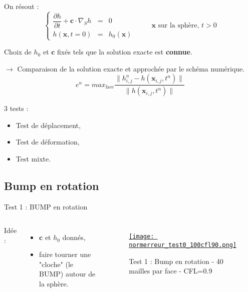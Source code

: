 \documentclass[11pt]{beamer}
\begin{document}
\begin{frame}
On résout :
$$\left\{
\begin{array}{rcl}
\dfrac{\partial h}{\partial t} + \mathbf{c} \cdot \nabla_S h & = & 0 \\
h(\mathbf{x},t=0) & = & h_0 ( \mathbf{x} )
\end{array}
\right. \hspace{1cm} \mathbf{x} \text{ sur la sphère, } t>0$$

Choix de $h_0$ et $\mathbf{c}$ fixés tels que la solution exacte est \textbf{connue}.

$\rightarrow$ Comparaison de la solution exacte et approchée par le schéma numérique.
$$e^n = max_{\text{face}} \dfrac{ \| h^n_{i,j} - h(\mathbf{x}_{i,j}, t^n ) \| }{\| h(\mathbf{x}_{i,j}, t^n ) \|}$$

3 tests : 
\begin{itemize}
\item Test de déplacement,\\
\item Test de déformation,\\
\item Test mixte.
\end{itemize}

\end{frame}



\subsection{Bump en rotation}
\begin{frame}{Test 1 : BUMP en rotation}
\begin{columns}
Idée :

\begin{itemize}
\item $\mathbf{c}$ et $h_0$ donnés,

\item faire tourner une "cloche" (le BUMP) autour de la sphère.
\end{itemize}



\begin{figure}
\href{run:CSapprox_test0.avi}{\texttt{[image: normerreur\_test0\_100cfl90.png]}} 
\caption{Test 1 : Bump en rotation - 40 mailles par face - CFL=0.9}
\end{figure}

\end{columns}
\end{frame}
\end{document}
